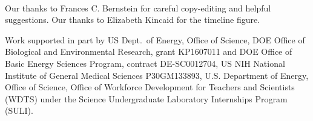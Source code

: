 \documentclass[preprint]{iucr}              %
\begin{document}
{     %

\appendix




\\

Our thanks to Frances C. Bernstein for careful copy-editing and
helpful suggestions.   Our thanks to Elizabeth Kincaid for the timeline figure.

Work supported in part by
 US Dept.~of Energy, Office of Science, DOE Office of Biological and Environmental Research, grant KP1607011 and 
DOE Office of Basic Energy Sciences Program, contract DE-SC0012704,
US NIH National Institute of General Medical Sciences P30GM133893,
U.S. Department of Energy, Office of Science, Office of Workforce Development for Teachers and Scientists (WDTS) under the Science Undergraduate Laboratory Internships Program (SULI).










}
\end{document}

